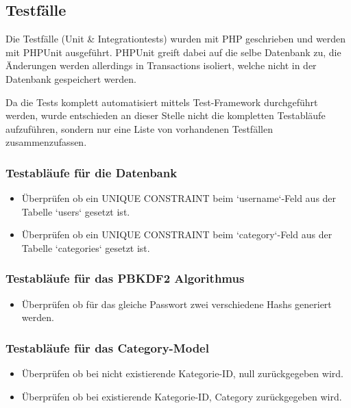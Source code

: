 \subsection{Testfälle}
Die Testfälle (Unit \& Integrationtests) wurden mit PHP geschrieben und werden mit PHPUnit ausgeführt. PHPUnit greift dabei auf die selbe Datenbank zu, die Änderungen werden allerdings in Transactions isoliert, welche nicht in der Datenbank gespeichert werden.

Da die Tests komplett automatisiert mittels Test-Framework durchgeführt werden, wurde entschieden an dieser Stelle nicht die kompletten Testabläufe aufzuführen, sondern nur eine Liste von vorhandenen Testfällen zusammenzufassen.

\subsubsection*{Testabläufe für die Datenbank}
\begin{itemize}
  \item Überprüfen ob ein UNIQUE CONSTRAINT beim `username`-Feld aus der Tabelle `users` gesetzt ist.
  \item Überprüfen ob ein UNIQUE CONSTRAINT beim `category`-Feld aus der Tabelle `categories` gesetzt ist.
\end{itemize}

\subsubsection*{Testabläufe für das PBKDF2 Algorithmus}
\begin{itemize}
  \item Überprüfen ob für das gleiche Passwort zwei verschiedene Hashs generiert werden.
\end{itemize}

\subsubsection*{Testabläufe für das Category-Model}
\begin{itemize}
  \item Überprüfen ob bei nicht existierende Kategorie-ID, null zurückgegeben wird.
  \item Überprüfen ob bei existierende Kategorie-ID, Category zurückgegeben wird.
\end{itemize}


